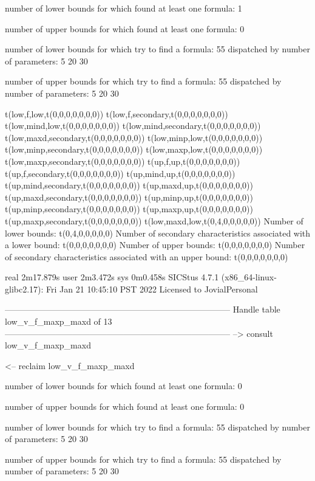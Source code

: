 number of lower bounds for which found at least one formula: 1

number of upper bounds for which found at least one formula: 0

number of lower bounds for which try to find a formula: 55
dispatched by number of parameters: 5  20  30

number of upper bounds for which try to find a formula: 55
dispatched by number of parameters: 5  20  30

t(low,f,low,t(0,0,0,0,0,0,0))
t(low,f,secondary,t(0,0,0,0,0,0,0))
t(low,mind,low,t(0,0,0,0,0,0,0))
t(low,mind,secondary,t(0,0,0,0,0,0,0))
t(low,maxd,secondary,t(0,0,0,0,0,0,0))
t(low,minp,low,t(0,0,0,0,0,0,0))
t(low,minp,secondary,t(0,0,0,0,0,0,0))
t(low,maxp,low,t(0,0,0,0,0,0,0))
t(low,maxp,secondary,t(0,0,0,0,0,0,0))
t(up,f,up,t(0,0,0,0,0,0,0))
t(up,f,secondary,t(0,0,0,0,0,0,0))
t(up,mind,up,t(0,0,0,0,0,0,0))
t(up,mind,secondary,t(0,0,0,0,0,0,0))
t(up,maxd,up,t(0,0,0,0,0,0,0))
t(up,maxd,secondary,t(0,0,0,0,0,0,0))
t(up,minp,up,t(0,0,0,0,0,0,0))
t(up,minp,secondary,t(0,0,0,0,0,0,0))
t(up,maxp,up,t(0,0,0,0,0,0,0))
t(up,maxp,secondary,t(0,0,0,0,0,0,0))
t(low,maxd,low,t(0,4,0,0,0,0,0))
Number of lower bounds:                                             t(0,4,0,0,0,0,0)
Number of secondary characteristics associated with a lower bound:  t(0,0,0,0,0,0,0)
Number of upper bounds:                                             t(0,0,0,0,0,0,0)
Number of secondary characteristics associated with an upper bound: t(0,0,0,0,0,0,0)

real	2m17.879s
user	2m3.472s
sys	0m0.458s
SICStus 4.7.1 (x86_64-linux-glibc2.17): Fri Jan 21 10:45:10 PST 2022
Licensed to JovialPersonal


--------------------------------------------------------------------------------
Handle table low_v_f_maxp_maxd of 13
--------------------------------------------------------------------------------
--> consult low_v_f_maxp_maxd

<-- reclaim low_v_f_maxp_maxd

number of lower bounds for which found at least one formula: 0

number of upper bounds for which found at least one formula: 0

number of lower bounds for which try to find a formula: 55
dispatched by number of parameters: 5  20  30

number of upper bounds for which try to find a formula: 55
dispatched by number of parameters: 5  20  30

